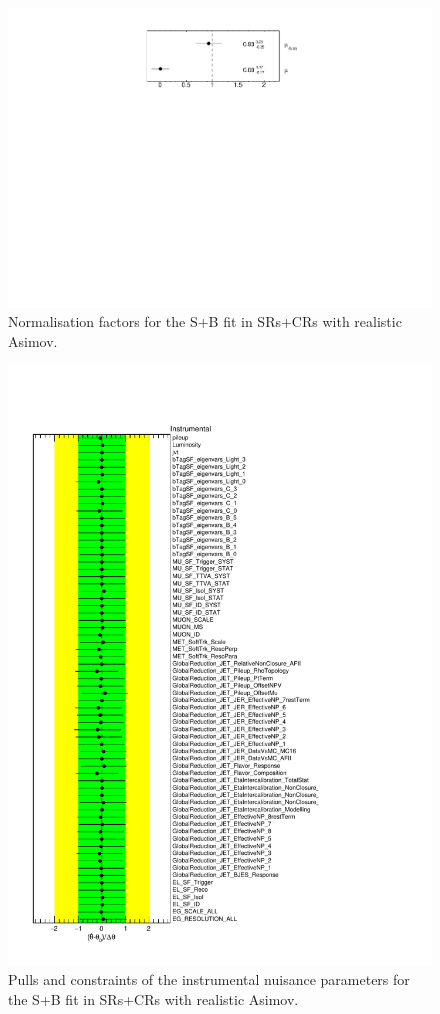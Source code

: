 \begin{figure}[htbp]
	\centering
	\includegraphics[width=.6\textwidth]{Chapters/CH8/figures/SPLUSB_CRSR_UsingDL1rcFullSys/NormFactors}
	\caption{Normalisation factors for the S+B \tZc fit in SRs+CRs with realistic Asimov.}%
	\label{fig:stat:tzc:splusb:crsr:norm}
\end{figure}

\begin{figure}[htbp]
	\centering
	\includegraphics[width=.8\textwidth]{Chapters/CH8/figures/SPLUSB_CRSR_UsingDL1rcFullSys/NuisPar_Instrumental}
	\caption{Pulls and constraints of the instrumental nuisance parameters for the S+B \tZc fit in SRs+CRs with realistic Asimov.}%
	\label{fig:stat:tzc:splusb:crsr:np:instr}
\end{figure}

